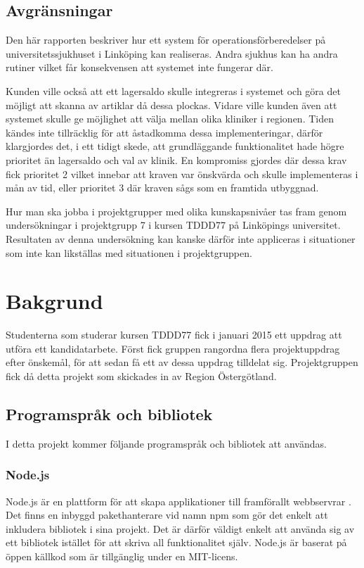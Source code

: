 \documentclass{article}
\begin{document}
\subsection{Avgränsningar}
Den här rapporten beskriver hur ett system för operationsförberedelser på universitetssjukhuset i Linköping kan realiseras. Andra sjukhus kan ha andra rutiner vilket får konsekvensen att systemet inte fungerar där.

Kunden ville också att ett lagersaldo skulle integreras i systemet och göra det möjligt att skanna av artiklar då dessa plockas. Vidare ville kunden även att systemet skulle ge möjlighet att välja mellan olika kliniker i regionen. Tiden kändes inte tillräcklig för att åstadkomma dessa implementeringar, därför klargjordes det, i ett tidigt skede, att grundläggande funktionalitet hade högre prioritet än lagersaldo och val av klinik. En kompromiss gjordes där dessa krav fick prioritet 2 vilket innebar att kraven var önskvärda och skulle implementeras i mån av tid, eller prioritet 3 där kraven sågs som en framtida utbyggnad.

Hur man ska jobba i projektgrupper med olika kunskapsnivåer tas fram genom undersökningar i projektgrupp 7 i kursen TDDD77 på Linköpings universitet. Resultaten av denna undersökning kan kanske därför inte appliceras i situationer som inte kan likställas med situationen i projektgruppen.

\section{Bakgrund}
\label{bakgrund}
Studenterna som studerar kursen TDDD77 fick i januari 2015 ett uppdrag att utföra ett kandidatarbete. Först fick gruppen rangordna flera projektuppdrag efter önskemål, för att sedan få ett av dessa uppdrag tilldelat sig. Projektgruppen fick då detta projekt som skickades in av Region Östergötland.

\subsection{Programspråk och bibliotek}
I detta projekt kommer följande programspråk och bibliotek att användas.

\subsubsection{Node.js}
Node.js är en plattform för att skapa applikationer till framförallt webbservrar \cite{nodejs}. Det finns en inbyggd pakethanterare vid namn npm som gör det enkelt att inkludera bibliotek i sina projekt. Det är därför väldigt enkelt att använda sig av ett bibliotek istället för att skriva all funktionalitet själv. Node.js är baserat på öppen källkod som är tillgänglig under en MIT-licens.
\end{document}
